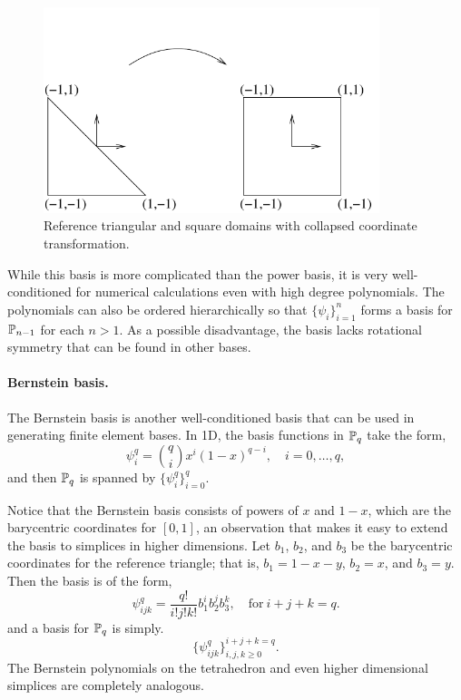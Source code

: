 \begin{figure}
\begin{center}
\includegraphics[height=6cm]{chapters/kirby-1/pdf/tricoord.pdf}
\end{center}
\caption{Reference triangular and square domains with collapsed
  coordinate transformation.}
\label{fig:tricoord}
\end{figure}

While this basis is more complicated than the power basis, it is
very well-conditioned for numerical calculations even with high degree
polynomials.  The polynomials can also be ordered hierarchically so that
$\{ \psi_i \}_{i=1}^{n}$ forms a basis for $\P_{n-1}$ for each $n >
1$.  As a possible disadvantage, the basis lacks rotational symmetry
that can be found in other bases.

\paragraph{Bernstein basis.}
The Bernstein basis is another well-conditioned basis that can be used
in generating finite element bases.  In 1D, the basis functions in $\P_q$
take the form,
\begin{equation}
\psi_i^q = \binom{q}{i} x^i (1-x)^{q-i}, \quad i=0,\ldots,q,
\end{equation}
and then $\P_q$ is spanned by $\{ \psi_i^q \}_{i=0}^q$.

Notice that the Bernstein basis consists of powers of $x$ and
$1-x$, which are the barycentric coordinates for $[0,1]$,
an observation that makes it easy to extend the basis to simplices
in higher dimensions.  Let $b_1$, $b_2$, and $b_3$ be the barycentric
coordinates for the reference triangle; that is, $b_1=1-x-y$, $b_2=x$,
and $b_3=y$. Then the basis is of the form,
\begin{equation}
\psi_{ijk}^q = \frac{q!}{i!j!k!} b_1^i b_2^j b_3^k, \quad  \mbox{for} \ i+j+k=q .
\end{equation}
and a basis for $\P_q$ is simply.
\begin{equation}
\{ \psi_{ijk}^q \}_{i,j,k\geqslant 0}^{i+j+k = q} .
\end{equation}
The Bernstein polynomials on the tetrahedron and even higher dimensional
simplices are completely analogous.


